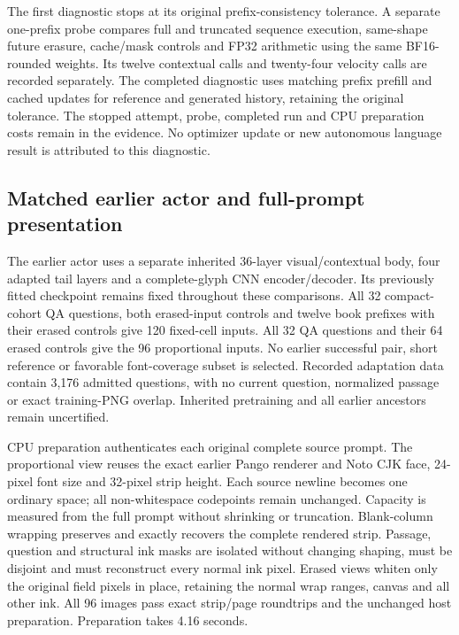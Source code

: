 \documentclass[12pt,a4paper]{article}
\providecommand{\DIFadd}[1]{{\protect\color{blue} \sf #1}} %
\providecommand{\DIFaddbegin}{} %
\begin{document}
The first diagnostic stops at its original prefix-consistency tolerance.
A separate one-prefix probe compares full and truncated sequence execution,
same-shape future erasure, cache/mask controls and FP32 arithmetic using the
same BF16-rounded weights. Its twelve contextual calls and twenty-four
velocity calls are recorded separately. The completed diagnostic uses
matching prefix prefill and cached updates for reference and generated
history, retaining the original tolerance. The stopped attempt, probe,
completed run and CPU preparation costs remain in the evidence. No optimizer
update or new autonomous language result is attributed to this diagnostic.

\DIFaddbegin \subsection*{\DIFadd{Matched earlier actor and full-prompt presentation}}
\DIFadd{The earlier actor uses a separate inherited 36-layer visual/contextual body,
four adapted tail layers and a complete-glyph CNN encoder/decoder. Its
previously fitted checkpoint remains fixed throughout these comparisons.
All 32 compact-cohort QA questions, both erased-input controls and twelve
book prefixes with their erased controls give 120 fixed-cell inputs. All
32 QA questions and their 64 erased controls give the 96 proportional inputs.
No earlier successful pair, short reference or favorable font-coverage subset
is selected. Recorded adaptation data contain 3,176 admitted questions, with
no current question, normalized passage or exact training-PNG overlap.
Inherited pretraining and all earlier ancestors remain uncertified.
}

\DIFadd{CPU preparation authenticates each original complete source prompt. The
proportional view reuses the exact earlier Pango renderer and Noto CJK face,
24-pixel font size and 32-pixel strip height. Each source newline becomes one
ordinary space; all non-whitespace codepoints remain unchanged. Capacity is
measured from the full prompt without shrinking or truncation. Blank-column
wrapping preserves and exactly recovers the complete rendered strip. Passage,
question and structural ink masks are isolated without changing shaping,
must be disjoint and must reconstruct every normal ink pixel. Erased views
whiten only the original field pixels in place, retaining the normal wrap
ranges, canvas and all other ink. All 96 images pass exact strip/page
roundtrips and the unchanged host preparation. Preparation takes 4.16 seconds.
}
\end{document}
